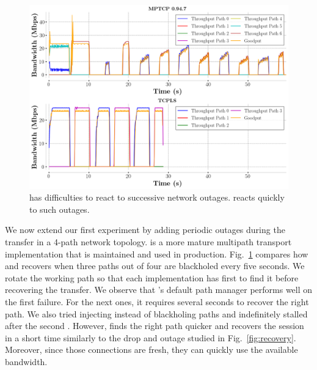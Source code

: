 \begin{figure}[!t]
  \begin{center}
    \includegraphics[width=\columnwidth]{figures/tcpls_mptcp.png}
  \end{center}
  \caption{\mptcp has difficulties to react to successive network outages.
  \tcpls reacts quickly to such outages.}
  \label{fig:failover}
\end{figure}

We now extend our first experiment by adding periodic outages during the
transfer in a 4-path network topology.
\mptcp is a more mature multipath transport implementation that is maintained
and used in production. Fig.~\ref{fig:failover} compares how \mptcp and \tcpls recovers when three paths out of four are blackholed every five seconds. We rotate the working path so that each implementation has first to find it before recovering the transfer. We observe that \mptcp's default path manager performs well on the first failure. For the next ones, it requires several seconds to recover the right path.
We also tried injecting \tcp \rst instead of blackholing paths and \mptcp
indefinitely stalled after the second \rst. However, \tcpls finds the right path quicker and recovers the session in a short time similarly to the drop and \rst outage studied in Fig.~\ref{fig:recovery}. Moreover, since those connections are fresh, they can quickly use the available bandwidth.

